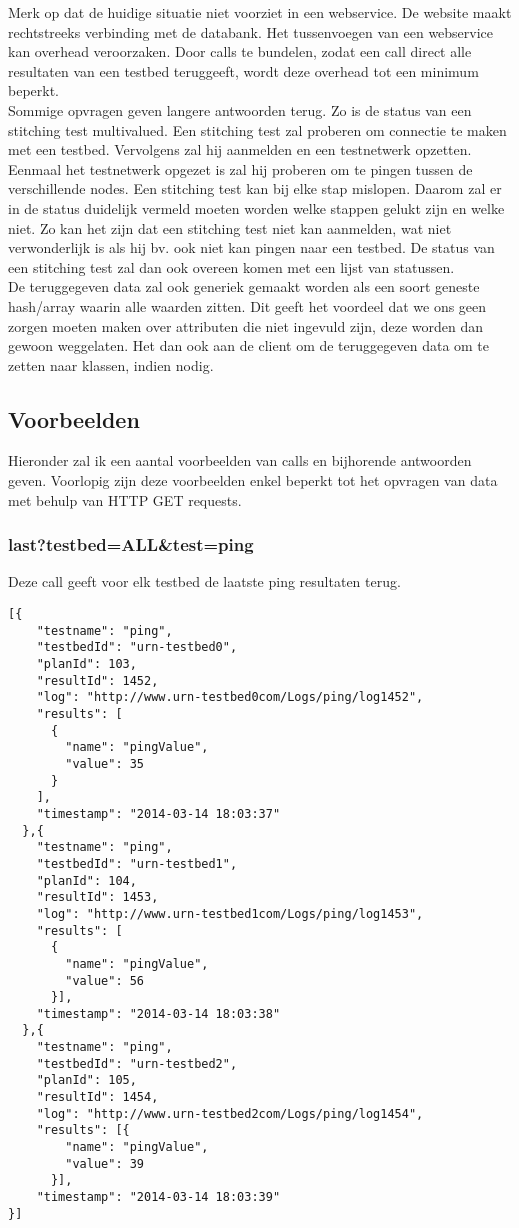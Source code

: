\documentclass[11pt]{article}
\begin{document}
Merk op dat de huidige situatie niet voorziet in een webservice. De website maakt rechtstreeks verbinding met de databank. Het tussenvoegen van een webservice kan overhead veroorzaken. Door calls te bundelen, zodat een call direct alle resultaten van een testbed teruggeeft, wordt deze overhead tot een minimum beperkt.\\

Sommige opvragen geven langere antwoorden terug. Zo is de status van een stitching test multivalued. Een stitching test zal proberen om connectie te maken met een testbed. Vervolgens zal hij aanmelden en een testnetwerk opzetten. Eenmaal het testnetwerk opgezet is zal hij proberen om te pingen tussen de verschillende nodes. Een stitching test kan bij elke stap mislopen. Daarom zal er in de status duidelijk vermeld moeten worden welke stappen gelukt zijn en welke niet. Zo kan het zijn dat een stitching test niet kan aanmelden, wat niet verwonderlijk is als hij bv. ook niet kan pingen naar een testbed. De status van een stitching test zal dan ook overeen komen met een lijst van statussen.\\

De teruggegeven data zal ook generiek gemaakt worden als een soort geneste hash/array waarin alle waarden zitten. Dit geeft het voordeel dat we ons geen zorgen moeten maken over attributen die niet ingevuld zijn, deze worden dan gewoon weggelaten. Het dan ook aan de client om de teruggegeven data om te zetten naar klassen, indien nodig.

\subsection{Voorbeelden}
Hieronder zal ik een aantal voorbeelden van calls en bijhorende antwoorden geven.
Voorlopig zijn deze voorbeelden enkel beperkt tot het opvragen van data met behulp van HTTP GET requests.

\clearpage
\subsubsection{last?testbed=ALL\&test=ping}
Deze call geeft voor elk testbed de laatste ping resultaten terug.
\begin{verbatim}
[{
    "testname": "ping",
    "testbedId": "urn-testbed0",
    "planId": 103,
    "resultId": 1452,
    "log": "http://www.urn-testbed0com/Logs/ping/log1452",
    "results": [
      {
        "name": "pingValue",
        "value": 35
      }
    ],
    "timestamp": "2014-03-14 18:03:37"
  },{
    "testname": "ping",
    "testbedId": "urn-testbed1",
    "planId": 104,
    "resultId": 1453,
    "log": "http://www.urn-testbed1com/Logs/ping/log1453",
    "results": [
      {
        "name": "pingValue",
        "value": 56
      }],
    "timestamp": "2014-03-14 18:03:38"
  },{
    "testname": "ping",
    "testbedId": "urn-testbed2",
    "planId": 105,
    "resultId": 1454,
    "log": "http://www.urn-testbed2com/Logs/ping/log1454",
    "results": [{
        "name": "pingValue",
        "value": 39
      }],
    "timestamp": "2014-03-14 18:03:39"
}]
\end{verbatim}
\clearpage
\end{document}
